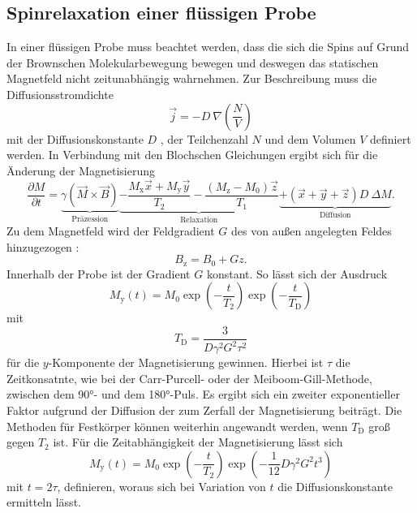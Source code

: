 \subsection{Spinrelaxation einer flüssigen Probe}
In einer flüssigen Probe muss beachtet werden, dass die sich die Spins auf
Grund der Brownschen Molekularbewegung bewegen und deswegen das statischen Magnetfeld
nicht zeitunabhängig wahrnehmen. Zur Beschreibung muss die Diffusionsstromdichte
\begin{equation}
  \vec{j} = - D\:\nabla\!\left(\frac{N}{V}\right)
\end{equation}
mit der Diffusionskonstante $D$ , der Teilchenzahl $N$ und dem Volumen $V$ definiert werden.
In Verbindung mit den Blochschen Gleichungen ergibt sich für die Änderung der
Magnetisierung
\begin{equation}
  \frac{\partial M}{\partial t} =
  \underbrace{\gamma \left(\vec{M} \times \vec{B}\right)}_{\text{Präzession}}
  \underbrace{- \frac{M_\text{x} \vec{x} + M_\text{y} \vec{y}}{T_2}
  - \frac{\left(M_\text{z} - M_0\right) \vec{z}}{T_1}}_{\text{Relaxation}}
  \underbrace{+ \left(\vec{x} + \vec{y} + \vec{z}\right) D\:\Delta M}_{\text{Diffusion}} .
\end{equation}
Zu dem Magnetfeld wird der Feldgradient $G$  des von außen angelegten Feldes hinzugezogen :
\begin{equation}
  B_\text{z} = B_0 + G z .
\end{equation}
Innerhalb der Probe ist der Gradient $G$ konstant.
So lässt sich der Ausdruck
\begin{equation*}
  M_\text{y}\!\left(t\right) = M_0
  \exp\!\left(- \frac{t}{T_2}\right)
  \exp\!\left(- \frac{t}{T_\text{D}}\right)
\end{equation*}
mit
\begin{equation*}
  T_\text{D} = \frac{3}{D \gamma^2 G^2 \tau^2}
\end{equation*}
für die $y$-Komponente der Magnetisierung gewinnen.
Hierbei ist $\tau$ die Zeitkonsatnte, wie bei der Carr-Purcell- oder der Meiboom-Gill-Methode, zwischen
dem 90°- und dem 180°-Puls.
Es ergibt sich ein zweiter exponentieller Faktor aufgrund der Diffusion der
zum Zerfall der Magnetisierung beiträgt.
Die Methoden für Festkörper können weiterhin
angewandt werden, wenn $T_\text{D}$ groß gegen $T_2$ ist.
Für die Zeitabhängigkeit der Magnetisierung lässt sich
\begin{equation}
  M_\text{y}\!\left(t\right) = M_0
  \exp\!\left(-\frac{t}{T_2}\right)
  \exp\!\left(-\frac{1}{12} D \gamma^2 G^2 t^3\right)
  \label{eq:DiffusionsBestimmung}
\end{equation}
mit $t = 2\tau$, definieren,
woraus sich bei Variation von $t$ die Diffusionskonstante ermitteln lässt.
